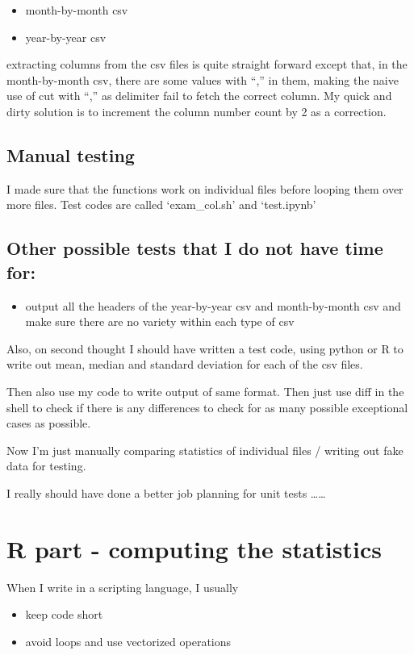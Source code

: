 \documentclass[letterpaper,10pt,english]{/usr/local/lib/python2.7/dist-packages/sphinx/texinputs/sphinxhowto}
\begin{document}
\begin{itemize}
\itemsep1pt\parskip0pt
\item
  month-by-month csv\\
\item
  year-by-year csv
\end{itemize}extracting columns from the csv files is quite straight forward except
that, in the month-by-month csv, there are some values with ``,'' in
them, making the naive use of cut with ``,'' as delimiter fail to fetch
the correct column. My quick and dirty solution is to increment the
column number count by 2 as a correction.\subsection{Manual testing}I made sure that the functions work on individual files before looping
them over more files. Test codes are called `exam\_col.sh' and
`test.ipynb'\subsection{Other possible tests that I do not have time for:}\begin{itemize}
\itemsep1pt\parskip0pt
\item
  output all the headers of the year-by-year csv and month-by-month csv
  and make sure there are no variety within each type of csv
\end{itemize}

Also, on second thought I should have written a test code, using python
or R to write out mean, median and standard deviation for each of the
csv files.

Then also use my code to write output of same format. Then just use diff
in the shell to check if there is any differences to check for as many
possible exceptional cases as possible.

Now I'm just manually comparing statistics of individual files / writing
out fake data for testing.

I really should have done a better job planning for unit tests
\ldots{}\ldots{}\section{R part - computing the statistics}When I write in a scripting language, I usually

\begin{itemize}
\itemsep1pt\parskip0pt
\item
  keep code short
\item
  avoid loops and use vectorized operations
\end{itemize}
\end{document}
